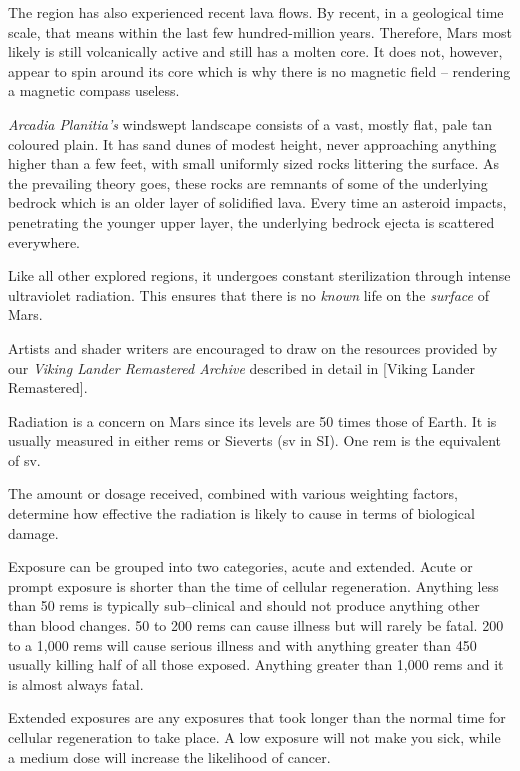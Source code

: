 The region has also experienced recent lava flows. By recent, in a geological time scale, that means within the last few hundred-million years. Therefore, Mars most likely is still volcanically active and still has a molten core. It does not, however, appear to spin around its core which is why there is no magnetic field -- rendering a magnetic compass useless.

{\it Arcadia Planitia's} windswept landscape consists of a vast, mostly flat, pale tan coloured plain. It has sand dunes of modest height, never approaching anything higher than a few feet, with small uniformly sized rocks littering the surface. As the prevailing theory goes, these rocks are remnants of some of the underlying bedrock which is an older layer of solidified lava. Every time an asteroid impacts, penetrating the younger upper layer, the underlying bedrock ejecta is scattered everywhere.

Like all other explored regions, it undergoes constant sterilization through intense ultraviolet radiation. This ensures that there is no {\it known} life on the {\it surface} of Mars.

Artists and shader writers are encouraged to draw on the resources provided by our {\it Viking Lander Remastered Archive} described in detail in [Viking Lander Remastered].


Radiation is a concern on Mars since its levels are 50 times those of Earth. It is usually measured in either rems or Sieverts (sv in SI). One rem is the equivalent of  sv.

The amount or dosage received, combined with various weighting factors, determine how effective the radiation is likely to cause in terms of biological damage.

Exposure can be grouped into two categories, acute and extended. Acute or prompt exposure is shorter than the time of cellular regeneration. Anything less than 50 rems is typically sub--clinical and should not produce anything other than blood changes. 50 to 200 rems can cause illness but will rarely be fatal. 200 to a 1,000 rems will cause serious illness and with anything greater than 450 usually killing half of all those exposed. Anything greater than 1,000 rems and it is almost always fatal.

Extended exposures are any exposures that took longer than the normal time for cellular regeneration to take place. A low exposure will not make you sick, while a medium dose will increase the likelihood of cancer.

